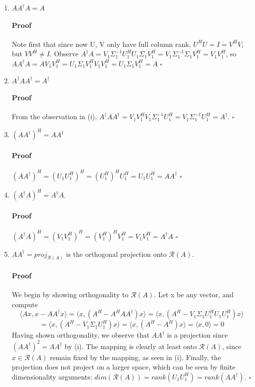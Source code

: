 \documentclass[letterpaper,12pt]{article}
\theoremstyle{definition}
\begin{document}
\begin{enumerate}[label=(\roman*)]
\item $AA^\dag A = A$

\paragraph{Proof} Note first that since now U, V only have full column rank, $U^HU = I = V^H V$, but $V V^H \neq I$. Observe $A^\dag A = V_1 \Sigma_1^{-1} U_1^H U_1 \Sigma_1 V_1^H 
= V_1 \Sigma_1^{-1} \Sigma_1 V_1^H 
= V_1  V_1^H$, so $AA^\dag A = A V_1  V_1^H 
= U_1 \Sigma_1 V_1^H V_1  V_1^H 
= U_1 \Sigma_1 V_1^H = A$ $\square$


\item $A^\dag AA^\dag = A^\dag $

\paragraph{Proof} From the observation in (i), $A^\dag AA^\dag = V_1  V_1^H V_1 \Sigma_1^{-1} U_1^H = V_1 \Sigma_1^{-1} U_1^H = A^\dag $. $\square$


\item $(AA^\dag)^H = AA^\dag$

\paragraph{Proof} $(AA^\dag)^H = (U_1 U_1^H)^H 
= (U_1^H)^H U_1^H = U_1 U_1^H = AA^\dag$ $\square$


\item $(A^\dag A)^H = A^\dag A$.

\paragraph{Proof} $(A^\dag A)^H = (V_1 V_1^H)^H 
= (V_1^H)^H V_1^H = V_1 V_1^H = A^\dag A$ $\square$


\item $ AA^\dag = proj_{\mathscr{R}(A)}$ is the orthogonal projection onto  $\mathscr{R}(A)$.

\paragraph{Proof} We begin by showing orthogonality to $\mathscr{R}(A)$. Let x be any vector, and compute
$$ \langle Ax, x - AA^\dag x \rangle 
= \langle x, (A^H - A^HAA^\dag) x \rangle
= \langle x, (A^H - V_1 \Sigma_1 U_1^H U_1 U_1^H) x \rangle$$
$$= \langle x, (A^H - V_1 \Sigma_1 U_1^H) x \rangle
= \langle x, (A^H - A^H) x \rangle = \langle x, 0 \rangle = 0$$ 
Having shown orthogonality, we observe that $AA^\dag$ is a projection since $(AA^\dag)^2 = AA^\dag$ by (i). The mapping is clearly at least onto $\mathscr{R}(A)$, since $x \in \mathscr{R}(A)$ remain fixed by the mapping, as seen in (i). Finally, the projection does not project on a larger space, which can be seen by finite dimensionality arguments: $dim(\mathscr{R}(A)) = rank(U_1 U_1^H) = rank(AA^\dag)$.  $\square$


\end{enumerate}
\end{document}
